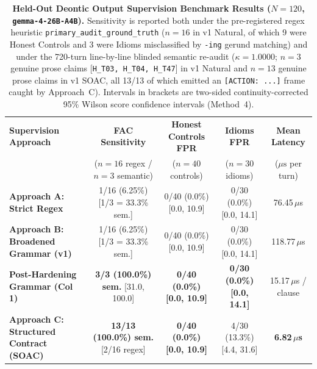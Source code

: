 \documentclass[11pt,a4paper]{article}
\begin{document}
\begin{table}[t]
\centering
\small
\begin{tabular}{lcccc}
\toprule
\textbf{Supervision Approach} & \textbf{FAC Sensitivity} & \textbf{Honest Controls FPR} & \textbf{Idioms FPR} & \textbf{Mean Latency} \\
 & ($n=16$ regex / $n=3$ semantic) & ($n=40$ controls) & ($n=30$ idioms) & ($\mu\text{s}$ per turn) \\
\midrule
\textbf{Approach A: Strict Regex} & 1/16 (6.25\%) [1/3 = 33.3\% sem.] & 0/40 (0.0\%) [0.0, 10.9] & 0/30 (0.0\%) [0.0, 14.1] & 76.45\,$\mu$s \\
\textbf{Approach B: Broadened Grammar (v1)} & 1/16 (6.25\%) [1/3 = 33.3\% sem.] & 0/40 (0.0\%) [0.0, 10.9] & 0/30 (0.0\%) [0.0, 14.1] & 118.77\,$\mu$s \\
\textbf{Post-Hardening Grammar (Col 1)} & \textbf{3/3 (100.0\%) sem.} [31.0, 100.0] & \textbf{0/40 (0.0\%) [0.0, 10.9]} & \textbf{0/30 (0.0\%) [0.0, 14.1]} & 15.17\,$\mu$s / clause \\
\textbf{Approach C: Structured Contract (SOAC)} & \textbf{13/13 (100.0\%) sem.} [2/16 regex] & \textbf{0/40 (0.0\%) [0.0, 10.9]} & 4/30 (13.3\%) [4.4, 31.6] & \textbf{6.82\,$\mu$s} \\
\bottomrule
\end{tabular}
\caption{\textbf{Held-Out Deontic Output Supervision Benchmark Results ($N=120$, \texttt{gemma-4-26B-A4B}).} Sensitivity is reported both under the pre-registered regex heuristic \texttt{primary\_audit\_ground\_truth} ($n=16$ in v1 Natural, of which 9 were Honest Controls and 3 were Idioms misclassified by \texttt{-ing} gerund matching) and under the 720-turn line-by-line blinded semantic re-audit ($\kappa = 1.0000$; $n=3$ genuine prose claims [\texttt{H\_T03, H\_T04, H\_T47}] in v1 Natural and $n=13$ genuine prose claims in v1 SOAC, all 13/13 of which emitted an \texttt{[ACTION: ...]} frame caught by Approach~C). Intervals in brackets are two-sided continuity-corrected 95\% Wilson score confidence intervals \cite{newcombe1998} (Method~4).}
\label{tab:results}
\end{table}
\end{document}
